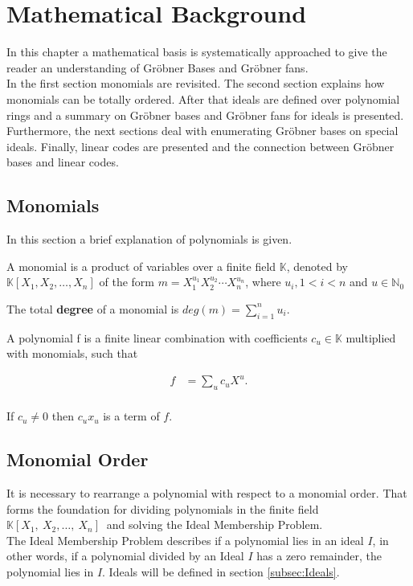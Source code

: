 \section{Mathematical Background}
\label{sec:background}

In this chapter a mathematical basis is systematically approached to give the reader an understanding of Gröbner Bases and Gröbner fans.\\
In the first section monomials are revisited. The second section explains how monomials can be totally ordered.
After that ideals are defined over polynomial rings and a summary on Gröbner bases and Gröbner fans for ideals is presented. Furthermore, the next sections deal with enumerating Gröbner bases on special ideals. Finally, linear codes are presented and the connection between Gröbner bases and linear codes.  

\subsection{Monomials}
\label{subseb:Monomials}

In this section a brief explanation of polynomials is given.

\begin{env_definition}[Monomial] 
\cite{KHZ}
A monomial is a product of variables over a finite field $\mathbb{K}$, denoted by $ \mathbb{K} \left[X_{1},X_{2},\dots, X_{n}\right]  $ of the form $m= X_{1}^{u_{1}}X_{2}^{u_{2}}\cdots X_{n}^{u_{n}}$, where $u_{i}, 1 < i < n $ and $u \in \mathbb{N}_{0} $
\end{env_definition}
The total \textbf{degree} of a monomial is $deg(m) = \sum_{i=1}^n u_i $. 


\begin{env_definition}[Polynomial]
\cite{KHZ}
A polynomial f is a finite linear combination with coefficients $c_{u} \in \mathbb{K}$ multiplied with monomials, such that


\begin{align*}
	f &= \sum_{u} c_{u}X^{u}. \\
\end{align*}

\end{env_definition}
If $c_{u}\neq0$ then $c_{u}x_{u}$ is a term of $f$.





\subsection{Monomial Order}
\label{subsec:Monomialorder}
It is necessary to rearrange a polynomial with respect to a monomial order. That forms the foundation for dividing polynomials in the finite field
$ \mathbb{K} \left[X_{1},~X_{2},\dots,~X_{n}\right]~$ and solving the Ideal Membership Problem.\\
The Ideal Membership Problem describes if a polynomial lies in an ideal $I$, in other words, if a polynomial divided by an Ideal $I$ has a zero remainder, the polynomial lies in $I$. Ideals will be defined in section \ref{subsec:Ideals}.

